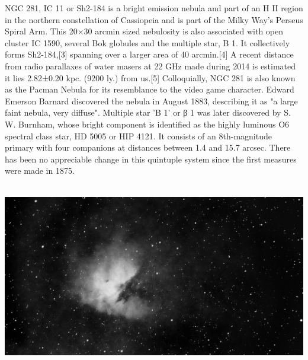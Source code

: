 {\footnotesize\color{white}
NGC 281, IC 11 or Sh2-184 is a bright emission nebula and part of an H II region in the northern constellation of Cassiopeia and is part of the Milky Way's Perseus Spiral Arm. This 20×30 arcmin sized nebulosity is also associated with open cluster IC 1590, several Bok globules and the multiple star, B 1. It collectively forms Sh2-184,[3] spanning over a larger area of 40 arcmin.[4] A recent distance from radio parallaxes of water masers at 22 GHz made during 2014 is estimated it lies 2.82±0.20 kpc. (9200 ly.) from us.[5] Colloquially, NGC 281 is also known as the Pacman Nebula for its resemblance to the video game character. Edward Emerson Barnard discovered the nebula in August 1883, describing it as "a large faint nebula, very diffuse". Multiple star 'B 1' or β 1 was later discovered by S. W. Burnham, whose bright component is identified as the highly luminous O6 spectral class star, HD 5005 or HIP 4121. It consists of an 8th-magnitude primary with four companions at distances between 1.4 and 15.7 arcsec. There has been no appreciable change in this quintuple system since the first measures were made in 1875.


}\ \\
\includegraphics[width=\textwidth]{../Imaging//Grayscale/Pacman_Nebula.jpg}
